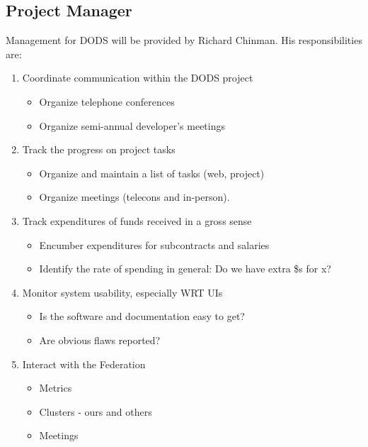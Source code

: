 \documentclass{article}
\begin{document}
\subsection*{Project Manager}
Management for DODS will be provided by Richard Chinman. His responsibilities
are: 
\begin{enumerate}

\item Coordinate communication within the DODS project

  \begin{itemize}
  \item Organize telephone conferences
  \item Organize semi-annual developer's meetings
  \end{itemize}

\item Track the progress on project tasks

  \begin{itemize}
  \item Organize and maintain a list of tasks (web, project)
  \item Organize meetings (telecons and in-person).
  \end{itemize}

\item Track expenditures of funds received in a gross sense

  \begin{itemize}
  \item Encumber expenditures for subcontracts and salaries
  \item Identify the rate of spending in general: Do we have extra \$s for x?
  \end{itemize}

\item Monitor system usability, especially WRT UIs

  \begin{itemize}
  \item Is the software and documentation easy to get?
  \item Are obvious flaws reported?
  \end{itemize}

\item Interact with the Federation

  \begin{itemize}
  \item Metrics
  \item Clusters - ours and others
  \item Meetings
  \end{itemize}
        

\end{enumerate}
\end{document}
